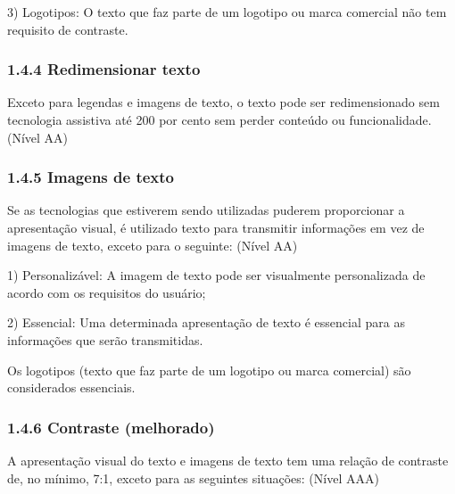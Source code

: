 \documentclass[a4paper]{article}
\begin{document}
\begin{titlepage}
\hspace{.1\textwidth} %
\begin{minipage}{.85\textwidth}
	3) Logotipos: O texto que faz parte de um logotipo ou marca comercial não tem requisito de contraste.\\
\end{minipage}

\subsubsection{1.4.4 Redimensionar texto}

Exceto para legendas e imagens de texto, o texto pode ser redimensionado sem tecnologia assistiva até 200 por cento sem perder conteúdo ou funcionalidade. (Nível AA)

\subsubsection{1.4.5 Imagens de texto}

Se as tecnologias que estiverem sendo utilizadas puderem proporcionar a apresentação visual, é utilizado texto para transmitir informações em vez de imagens de texto, exceto para o seguinte: (Nível AA)\\

\hspace{.1\textwidth} %
\begin{minipage}{.85\textwidth}
	1) Personalizável: A imagem de texto pode ser visualmente personalizada de acordo com os requisitos do usuário;\\
\end{minipage}

\hspace{.1\textwidth} %
\begin{minipage}{.85\textwidth}
	2) Essencial: Uma determinada apresentação de texto é essencial para as informações que serão transmitidas.\\
\end{minipage}

Os logotipos (texto que faz parte de um logotipo ou marca comercial) são considerados essenciais.

\subsubsection{1.4.6 Contraste (melhorado)}

A apresentação visual do texto e imagens de texto tem uma relação de contraste de, no mínimo, 7:1, exceto para as seguintes situações: (Nível AAA)\\


\end{titlepage}
\end{document}
